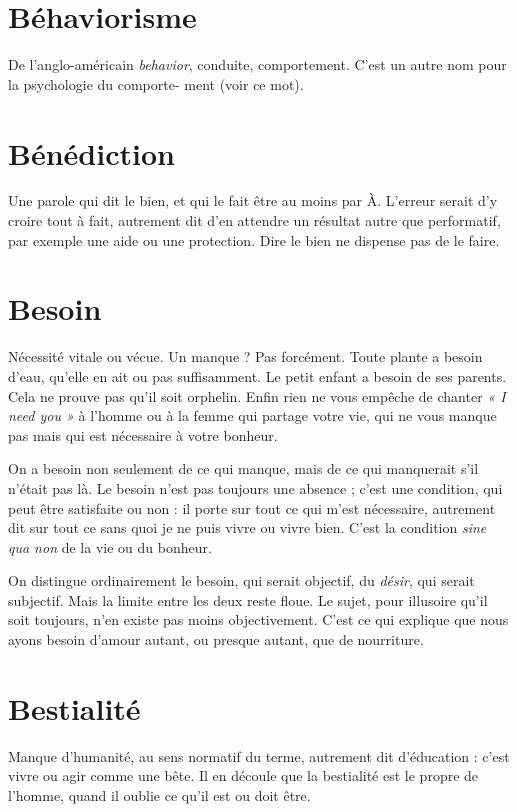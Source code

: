 \section{Béhaviorisme}
De l’anglo-américain {\it behavior}, conduite, comportement.
C’est un autre nom pour la psychologie du comporte-
ment (voir ce mot).

\section{Bénédiction}
Une parole qui dit le bien, et qui le fait être au moins par
À. L'erreur serait d’y croire tout à fait, autrement dit d’en
attendre un résultat autre que performatif, par exemple une aide ou une protection.
Dire le bien ne dispense pas de le faire.

\section{Besoin}
Nécessité vitale ou vécue. Un manque ? Pas forcément. Toute plante
a besoin d’eau, qu’elle en ait ou pas suffisamment. Le petit enfant a
besoin de ses parents. Cela ne prouve pas qu’il soit orphelin. Enfin rien ne vous
empêche de chanter {\it « I need you »} à l'homme ou à la femme qui partage votre
vie, qui ne vous manque pas mais qui est nécessaire à votre bonheur.

On a besoin non seulement de ce qui manque, mais de ce qui manquerait
s’il n’était pas là. Le besoin n’est pas toujours une absence ; c’est une condition,
qui peut être satisfaite ou non : il porte sur tout ce qui m'est nécessaire, autrement
dit sur tout ce sans quoi je ne puis vivre ou vivre bien. C’est la condition
{\it sine qua non} de la vie ou du bonheur.

On distingue ordinairement le besoin, qui serait objectif, du {\it désir}, qui serait
subjectif. Mais la limite entre les deux reste floue. Le sujet, pour illusoire qu’il
soit toujours, n’en existe pas moins objectivement. C’est ce qui explique que
nous ayons besoin d’amour autant, ou presque autant, que de nourriture.

\section{Bestialité}
Manque d'humanité, au sens normatif du terme, autrement
dit d'éducation : c’est vivre ou agir comme une bête. Il en
découle que la bestialité est le propre de l’homme, quand il oublie ce qu’il est
ou doit être.

